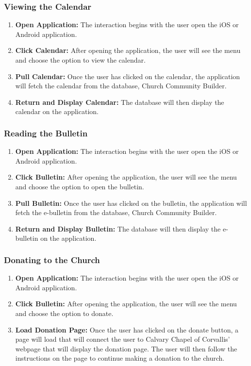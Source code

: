 \documentclass[letterpaper,10pt,draftclsnofoot,onecolumn,titlepage]{IEEEtran}
\begin{document}
			\subsubsection{Viewing the Calendar}
				\begin{enumerate}
					\item \textbf{Open Application:} The interaction begins with the user open the iOS or Android application. 
					\item \textbf{Click Calendar:} After opening the application, the user will see the menu and choose the option to view the calendar. 
					\item \textbf{Pull Calendar:} Once the user has clicked on the calendar, the application will fetch the calendar from the database, Church Community Builder.
					\item \textbf{Return and Display Calendar:} The database will then display the calendar on the application. 
				\end{enumerate}
				
			\subsubsection{Reading the Bulletin}
				\begin{enumerate}
					\item \textbf{Open Application:} The interaction begins with the user open the iOS or Android application. 
					\item \textbf{Click Bulletin:} After opening the application, the user will see the menu and choose the option to open the bulletin. 
					\item \textbf{Pull Bulletin:} Once the user has clicked on the bulletin, the application will fetch the e-bulletin from the database, Church Community Builder.
					\item \textbf{Return and Display Bulletin:} The database will then display the e-bulletin on the application. 
				\end{enumerate}
				
			\subsubsection{Donating to the Church}
				\begin{enumerate}
					\item \textbf{Open Application:} The interaction begins with the user open the iOS or Android application. 
					\item \textbf{Click Bulletin:} After opening the application, the user will see the menu and choose the option to donate. 
					\item \textbf{Load Donation Page:} Once the user has clicked on the donate button, a page will load that will connect the user to Calvary Chapel of Corvallis' webpage that will display the donation page. 
					The user will then follow the instructions on the page to continue making a donation to the church. 
				\end{enumerate}
				
\end{document}
